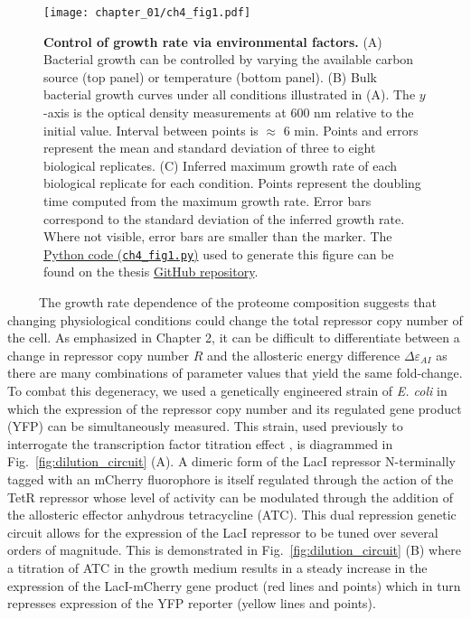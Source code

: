 \documentclass[12pt]{caltech_thesis}
\begin{document}
\hypertarget{fig:growth_control}{%
\begin{figure}
\centering
\texttt{[image: chapter\_01/ch4\_fig1.pdf]}
\caption[{Controlling physiological state of \emph{E. coli} via growth
rate modulation by environmental factors.}]{\textbf{Control of growth
rate via environmental factors.} (A) Bacterial growth can be controlled
by varying the available carbon source (top panel) or temperature
(bottom panel). (B) Bulk bacterial growth curves under all conditions
illustrated in (A). The \(y\)-axis is the optical density measurements
at 600 nm relative to the initial value. Interval between points is
\(\approx\) 6 min. Points and errors represent the mean and standard
deviation of three to eight biological replicates. (C) Inferred maximum
growth rate of each biological replicate for each condition. Points
represent the doubling time computed from the maximum growth rate. Error
bars correspond to the standard deviation of the inferred growth rate.
Where not visible, error bars are smaller than the marker. The
\href{https://github.com/gchure/phd/blob/master/src/chapter_04/code/ch4_fig1.py}{Python
code (\texttt{ch4\_fig1.py})} used to generate this figure can be found
on the thesis \href{https://github.com/gchure/phd}{GitHub repository}.}
\label{fig:growth_control}
\end{figure}
}

~~~~~The growth rate dependence of the proteome composition suggests
that changing physiological conditions could change the total repressor
copy number of the cell. As emphasized in Chapter 2, it can be difficult
to differentiate between a change in repressor copy number \(R\) and the
allosteric energy difference \(\Delta\varepsilon_{AI}\) as there are
many combinations of parameter values that yield the same fold-change.
To combat this degeneracy, we used a genetically engineered strain of
\emph{E. coli} in which the expression of the repressor copy number and
its regulated gene product (YFP) can be simultaneously measured. This
strain, used previously to interrogate the transcription factor
titration effect \autocite{brewster2014}, is diagrammed in
Fig.~\ref{fig:dilution_circuit} (A). A dimeric form of the LacI
repressor N-terminally tagged with an mCherry fluorophore is itself
regulated through the action of the TetR repressor whose level of
activity can be modulated through the addition of the allosteric
effector anhydrous tetracycline (ATC). This dual repression genetic
circuit allows for the expression of the LacI repressor to be tuned over
several orders of magnitude. This is demonstrated in
Fig.~\ref{fig:dilution_circuit} (B) where a titration of ATC in the
growth medium results in a steady increase in the expression of the
LacI-mCherry gene product (red lines and points) which in turn represses
expression of the YFP reporter (yellow lines and points).
\end{document}
